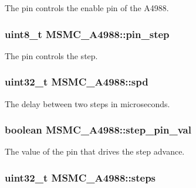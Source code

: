 The pin controls the enable pin of the A4988. 

\hypertarget{class_m_s_m_c___a4988_a2ea61398ce88d1ee627b409a5965b478}{
\subsubsection[{pin\+\_\+step}]{\setlength{\rightskip}{0pt plus 5cm}uint8\+\_\+t M\+S\+M\+C\+\_\+\+A4988\+::pin\+\_\+step\hspace{0.3cm}{\ttfamily [private]}}}\label{class_m_s_m_c___a4988_a2ea61398ce88d1ee627b409a5965b478}


The pin controls the step. 

\hypertarget{class_m_s_m_c___a4988_a6453efb52d22739962c05b0d03f65aa7}{
\subsubsection[{spd}]{\setlength{\rightskip}{0pt plus 5cm}uint32\+\_\+t M\+S\+M\+C\+\_\+\+A4988\+::spd\hspace{0.3cm}{\ttfamily [private]}}}\label{class_m_s_m_c___a4988_a6453efb52d22739962c05b0d03f65aa7}


The delay between two steps in microseconds. 

\hypertarget{class_m_s_m_c___a4988_a1ec86b6286b8827eca6d5703a02f65fd}{
\subsubsection[{step\+\_\+pin\+\_\+val}]{\setlength{\rightskip}{0pt plus 5cm}boolean M\+S\+M\+C\+\_\+\+A4988\+::step\+\_\+pin\+\_\+val\hspace{0.3cm}{\ttfamily [private]}}}\label{class_m_s_m_c___a4988_a1ec86b6286b8827eca6d5703a02f65fd}


The value of the pin that drives the step advance. 

\hypertarget{class_m_s_m_c___a4988_aa85fc95facc940db652cd2f545f033cd}{
\subsubsection[{steps}]{\setlength{\rightskip}{0pt plus 5cm}uint32\+\_\+t M\+S\+M\+C\+\_\+\+A4988\+::steps\hspace{0.3cm}{\ttfamily [private]}}}\label{class_m_s_m_c___a4988_aa85fc95facc940db652cd2f545f033cd}


